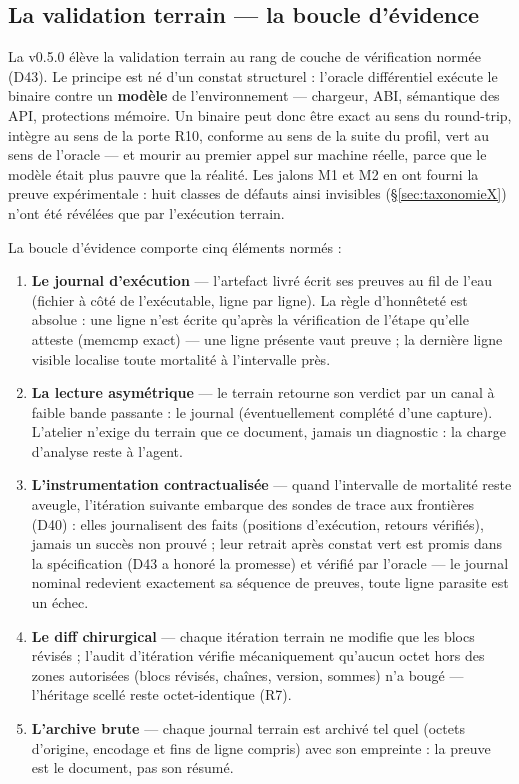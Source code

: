\subsection{La validation terrain — la boucle d'évidence}\label{sec:terrain}

La v0.5.0 élève la validation terrain au rang de couche de vérification normée (D43). Le
principe est né d'un constat structurel : l'oracle différentiel exécute le binaire contre un
\textbf{modèle} de l'environnement — chargeur, ABI, sémantique des API, protections mémoire.
Un binaire peut donc être exact au sens du round-trip, intègre au sens de la porte R10,
conforme au sens de la suite du profil, vert au sens de l'oracle — et mourir au premier appel
sur machine réelle, parce que le modèle était plus pauvre que la réalité. Les jalons M1 et
M2 en ont fourni la preuve expérimentale : huit classes de défauts ainsi invisibles
(§\ref{sec:taxonomieX}) n'ont été révélées que par l'exécution terrain.

La boucle d'évidence comporte cinq éléments normés :

\begin{enumerate}
\item \textbf{Le journal d'exécution} — l'artefact livré écrit ses preuves au fil de l'eau
(fichier à côté de l'exécutable, ligne par ligne). La règle d'honnêteté est absolue : une
ligne n'est écrite qu'après la vérification de l'étape qu'elle atteste (memcmp exact) — une
ligne présente vaut preuve ; la dernière ligne visible localise toute mortalité à
l'intervalle près.
\item \textbf{La lecture asymétrique} — le terrain retourne son verdict par un canal à
faible bande passante : le journal (éventuellement complété d'une capture). L'atelier
n'exige du terrain que ce document, jamais un diagnostic : la charge d'analyse reste à
l'agent.
\item \textbf{L'instrumentation contractualisée} — quand l'intervalle de mortalité reste
aveugle, l'itération suivante embarque des sondes de trace aux frontières (D40) : elles
journalisent des faits (positions d'exécution, retours vérifiés), jamais un succès non
prouvé ; leur retrait après constat vert est promis dans la spécification (D43 a honoré la
promesse) et vérifié par l'oracle — le journal nominal redevient exactement sa séquence de
preuves, toute ligne parasite est un échec.
\item \textbf{Le diff chirurgical} — chaque itération terrain ne modifie que les blocs
révisés ; l'audit d'itération vérifie mécaniquement qu'aucun octet hors des zones
autorisées (blocs révisés, chaînes, version, sommes) n'a bougé — l'héritage scellé reste
octet-identique (R7).
\item \textbf{L'archive brute} — chaque journal terrain est archivé tel quel (octets
d'origine, encodage et fins de ligne compris) avec son empreinte : la preuve est le
document, pas son résumé.
\end{enumerate}

